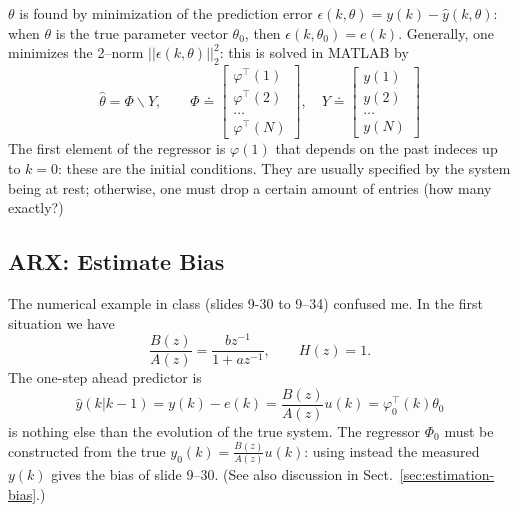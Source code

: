 $\theta$ is found by minimization of the prediction error $\epsilon(k,\theta) = y(k) - \hat{y}(k,\theta)$: when $\theta$ is the true parameter vector $\theta_0$, then $\epsilon(k,\theta_0)=e(k)$. Generally, one minimizes the 2--norm $||\epsilon(k,\theta)||_2^2$: this  is solved in MATLAB by
\begin{equation}
  \label{eq:ARX-solution}
  \hat{\theta} = \Phi \backslash Y,\hspace{2em} \Phi \doteq
  \begin{bmatrix}
    \varphi^\top(1) \\ \varphi^\top(2) \\ \ldots \\ \varphi^\top(N)
  \end{bmatrix}, \hspace{1em} Y \doteq
  \begin{bmatrix}
    y(1) \\ y(2) \\ \ldots \\ y(N)
  \end{bmatrix}
\end{equation}
The first element of the regressor is $\varphi(1)$ that depends on the past indeces up to $k=0$: these are the initial conditions. They are usually specified by the system being at rest; otherwise, one must drop a certain amount of entries (how many exactly?)

\subsection{ARX: Estimate Bias}
\label{sec:estimate-bias-ARX}

The numerical example in class (slides 9-30 to 9--34) confused me. In the first situation we have
\begin{equation*}
  \frac{B(z)}{A(z)} = \frac{bz^{-1}}{1 + az^{-1}}, \hspace{2em} H(z)=1.
\end{equation*}
The one-step ahead predictor is
\begin{equation*}
  \hat{y}(k|k-1) = y(k) - e(k) = \frac{B(z)}{A(z)}u(k) = \varphi_0^\top(k)\theta_0
\end{equation*}
is nothing else than the evolution of the true system. The regressor $\Phi_0$ must be constructed from the true $y_0(k) = \frac{B(z)}{A(z)}u(k)$: using instead the measured $y(k)$ gives the bias of slide 9--30. (See also discussion in Sect.~\ref{sec:estimation-bias}.)

